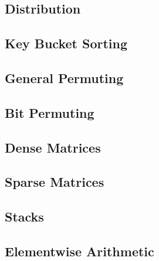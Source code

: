 


\subsection{Distribution}
\label{sec:ref-imp-ami-distribution}

\tobewritten


\subsection{Key Bucket Sorting}
\label{sec:ref-imp-ami-kb-sort}

\tobewritten


\subsection{General Permuting}
\label{sec:ref-imp-ami-gp}

\tobewritten


\subsection{Bit Permuting}
\label{sec:ref-imp-ami-bp}

\tobewritten


\subsection{Dense Matrices}
\label{sec:ref-imp-ami-matrix}

\tobewritten


\subsection{Sparse Matrices}
\label{sec:ref-imp-ami-sm}

\tobewritten


\subsection{Stacks}
\label{sec:ref-imp-ami-stack}

\tobewritten


\subsection{Elementwise Arithmetic}
\label{sec:ref-imp-ami-arith}

\tobewritten


